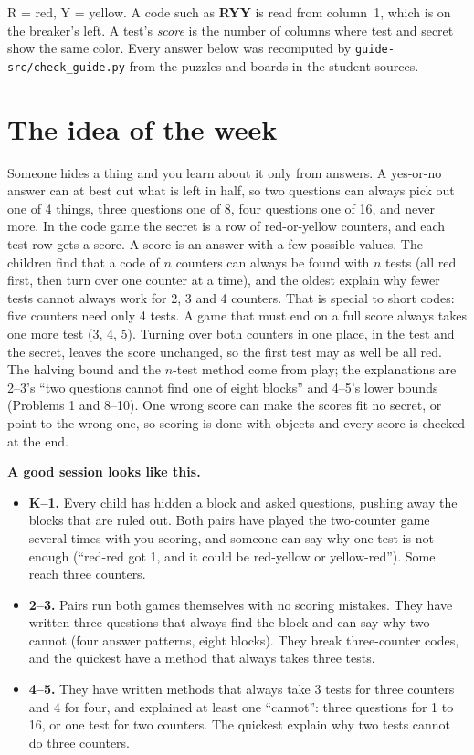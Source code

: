 \documentclass[11pt]{article}
\newcommand{\cd}[1]{\mbox{\textsf{\textbf{#1}}}}   %
\begin{document}
\small R = red, Y = yellow. A code such as \cd{RYY} is read from column~1, which is on the breaker's left. A test's \emph{score} is the number of columns where test and secret show the same color. Every answer below was recomputed by \texttt{guide-src/check\_guide.py} from the puzzles and boards in the student sources.
\normalsize

\section{The idea of the week}

Someone hides a thing and you learn about it only from answers. A yes-or-no answer can at best cut what is left in half, so two questions can always pick out one of 4 things, three questions one of 8, four questions one of 16, and never more. In the code game the secret is a row of red-or-yellow counters, and each test row gets a score. A score is an answer with a few possible values. The children find that a code of $n$ counters can always be found with $n$ tests (all red first, then turn over one counter at a time), and the oldest explain why fewer tests cannot always work for 2, 3 and 4 counters. That is special to short codes: five counters need only 4 tests. A game that must end on a full score always takes one more test (3, 4, 5). Turning over both counters in one place, in the test and the secret, leaves the score unchanged, so the first test may as well be all red. The halving bound and the $n$-test method come from play; the explanations are 2--3's ``two questions cannot find one of eight blocks'' and 4--5's lower bounds (Problems 1 and 8--10). One wrong score can make the scores fit no secret, or point to the wrong one, so scoring is done with objects and every score is checked at the end.

\textbf{A good session looks like this.}
\begin{itemize}
\item \textbf{K--1.} Every child has hidden a block and asked questions, pushing away the blocks that are ruled out. Both pairs have played the two-counter game several times with you scoring, and someone can say why one test is not enough (``red-red got 1, and it could be red-yellow or yellow-red''). Some reach three counters.
\item \textbf{2--3.} Pairs run both games themselves with no scoring mistakes. They have written three questions that always find the block and can say why two cannot (four answer patterns, eight blocks). They break three-counter codes, and the quickest have a method that always takes three tests.
\item \textbf{4--5.} They have written methods that always take 3 tests for three counters and 4 for four, and explained at least one ``cannot'': three questions for 1 to 16, or one test for two counters. The quickest explain why two tests cannot do three counters.
\end{itemize}
\end{document}

